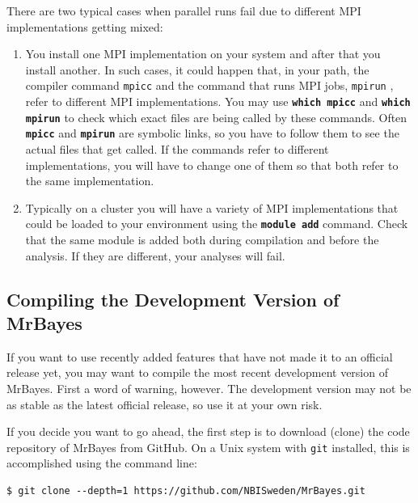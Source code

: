 \documentclass[12pt]{book}
\newcommand{\ttt}[1]{\texttt{#1} }
\newcommand{\tb}[1]{\texttt{\textbf{#1}} }
\begin{document}
There are two typical cases when parallel runs fail due to different MPI implementations getting
mixed:
 
\begin{enumerate}
\item You install one MPI implementation on your system and after that you install another. In 
such cases, it could happen that, in your path, the compiler command \ttt{mpicc} and the command
that runs MPI jobs, \ttt{mpirun}, refer to different MPI implementations. You may use
\tb{which mpicc} and \tb{which mpirun} to check which exact files are being called by these
commands. Often \tb{mpicc} and \tb{mpirun} are symbolic links, so you have to follow them to see
the actual files that get called. If the commands refer to different implementations, you will
have to change one of them so that both refer to the same implementation.
\item Typically on a cluster you will have a variety of MPI implementations that could be loaded
to your environment using the \tb{module add} command.  Check that the same module is added both
during compilation and before the analysis. If they are different, your analyses will fail.
\end{enumerate}

\subsection{Compiling the Development Version of MrBayes}
\label{compileDevVersion}
If you want to use recently added features that have not made it to an official release yet, you
may want to compile the most recent development version of MrBayes. First a word of warning,
however. The development version may not be as stable as the latest official release, so use it at
your own risk.

If you decide you want to go ahead, the first step is to download (clone) the code repository of
MrBayes from GitHub. On a Unix system with \ttt{git} installed, this is accomplished using the
command line:

\begin{verbatim}
$ git clone --depth=1 https://github.com/NBISweden/MrBayes.git
\end{verbatim}
\end{document}
